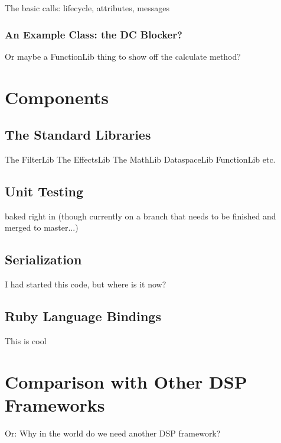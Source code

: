 \documentclass[twoside,10pt]{article}
\begin{document}
The basic calls: lifecycle, attributes, messages

\subsubsection{An Example Class: the DC Blocker?}

Or maybe a FunctionLib thing to show off the calculate method?



\section{Components} %

\subsection{The Standard Libraries}

The FilterLib
The EffectsLib
The MathLib
DataspaceLib
FunctionLib
etc.

\subsection{Unit Testing}

baked right in (though currently on a branch that needs to be finished and merged to master...)


\subsection{Serialization}

I had started this code, but where is it now?


\subsection{Ruby Language Bindings}

This is cool




\section{Comparison with Other DSP Frameworks} %

Or: Why in the world do we need another DSP framework?
\end{document}

